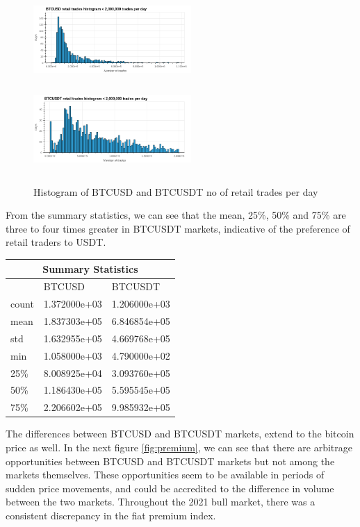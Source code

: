 \documentclass[10pt]{asme2ej}
\begin{document}
\begin{figure}[H]
	\centering
	\includegraphics[width=6cm, height = 3.3cm]{btcusd_hist.png}
	\includegraphics[width=6cm, height = 3.3cm]{btcusdt_hist.png}
	\caption{Histogram of BTCUSD and BTCUSDT no of retail trades per day}
	\label{fig:hist}
\end{figure}

From the summary statistics, we can see that the mean, 25\%, 50\% and 75\% are three to four times greater in BTCUSDT markets, indicative of the preference of retail traders to USDT.


\begin{center}
	\begin{tabular}{ |p{3cm}||p{3cm}|p{3cm}| }
		\hline
		\multicolumn{3}{|c|}{Summary Statistics} \\
		\hline
		& BTCUSD  & BTCUSDT \\
		\hline
		count   & 1.372000e+03	   &1.206000e+03 \\
		mean &   1.837303e+05	  & 6.846854e+05   \\
		std &1.632955e+05 & 4.669768e+05\\
		min    &1.058000e+03 & 4.790000e+02\\
		25\% &   8.008925e+04  & 3.093760e+05\\
		50\% & 1.186430e+05  & 5.595545e+05   \\
		75\% & 2.206602e+05  & 9.985932e+05\\
		\hline
	\end{tabular}
\end{center}


The differences between BTCUSD and BTCUSDT markets, extend to the bitcoin price as well. In the next figure \ref{fig:premium}, we can see that there are arbitrage opportunities between BTCUSD and BTCUSDT markets but not among the markets themselves. These opportunities seem to be available in periods of sudden price movements, and could be accredited to the difference in volume between the two markets. Throughout the 2021 bull market, there was a consistent discrepancy in the fiat premium index.
\end{document}
